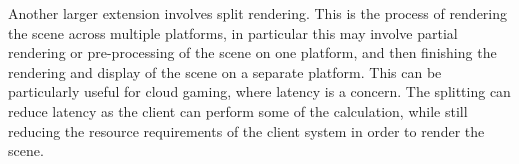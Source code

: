 Another larger extension involves split rendering. This is the
process of rendering the scene across multiple platforms, in particular
this may involve partial rendering or pre-processing of the scene on one
platform, and then finishing the rendering and display of the scene on a
separate platform. This can be particularly useful for cloud gaming,
where latency is a concern. The splitting can reduce latency as the client
can perform some of the calculation, while still reducing the resource
requirements of the client system in order to render the scene.
